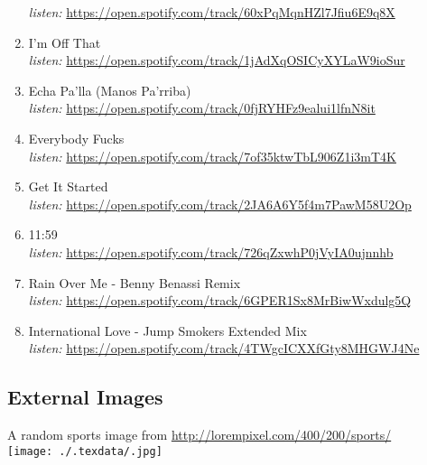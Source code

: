 \documentclass{article}
\begin{document}
\begin{enumerate}
            \textit{listen:}
              \underline{ https://open.spotify.com/track/60xPqMqnHZl7Jfiu6E9q8X }
                      \item I'm Off That\\
            \textit{listen:}
              \underline{ https://open.spotify.com/track/1jAdXqOSICyXYLaW9ioSur }
                      \item Echa Pa'lla (Manos Pa'rriba)\\
            \textit{listen:}
              \underline{ https://open.spotify.com/track/0fjRYHFz9ealui1lfnN8it }
                      \item Everybody Fucks\\
            \textit{listen:}
              \underline{ https://open.spotify.com/track/7of35ktwTbL906Z1i3mT4K }
                      \item Get It Started\\
            \textit{listen:}
              \underline{ https://open.spotify.com/track/2JA6A6Y5f4m7PawM58U2Op }
                      \item 11:59\\
            \textit{listen:}
              \underline{ https://open.spotify.com/track/726qZxwhP0jVyIA0ujnnhb }
                      \item Rain Over Me - Benny Benassi Remix\\
            \textit{listen:}
              \underline{ https://open.spotify.com/track/6GPER1Sx8MrBiwWxdulg5Q }
                      \item International Love - Jump Smokers Extended Mix\\
            \textit{listen:}
              \underline{ https://open.spotify.com/track/4TWgcICXXfGty8MHGWJ4Ne }
              \end{enumerate}

    \subsection{External Images}
    \label{sub:External Images}
    A random sports image from \underline{http://lorempixel.com/400/200/sports/}\\
        \texttt{[image: ./.texdata/.jpg]}
\end{document}
